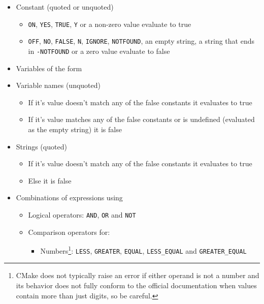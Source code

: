 \documentclass[table, xcdraw]{article}%
\begin{document}
\begin{itemize}
\item Constant (quoted or unquoted)
\begin{itemize}
    \item \texttt{ON}, \texttt{YES}, \texttt{TRUE}, \texttt{Y} or a non-zero value evaluate to true
    \item \texttt{OFF}, \texttt{NO}, \texttt{FALSE}, \texttt{N}, \texttt{IGNORE}, \texttt{NOTFOUND}, an empty string, a string that ends in \texttt{-NOTFOUND} or a zero value evaluate to false
\end{itemize}
\item Variables of the form %
\item Variable names (unquoted)
\begin{itemize}
    \item If it's value doesn't match any of the false constants it evaluates to true
    \item If it's value matches any of the false constants or is undefined (evaluated as the empty string) it is false
\end{itemize}
\item Strings (quoted)
\begin{itemize}
    \item If it's value doesn't match any of the false constants it evaluates to true
    \item Else it is false
\end{itemize}
\item Combinations of expressions using
\begin{itemize}
    \item Logical operators: \texttt{AND}, \texttt{OR} and \texttt{NOT}
    \item Comparison operators for:
    \begin{itemize}
        \item Numbers\footnote{CMake does not typically raise an error if either operand is not a number and its behavior does not fully conform to the official documentation when values contain more than just digits, so be careful.}: \texttt{LESS}, \texttt{GREATER}, \texttt{EQUAL}, \texttt{LESS_EQUAL} and \texttt{GREATER_EQUAL}

\end{itemize}
\end{itemize}
\end{itemize}
\end{document}
